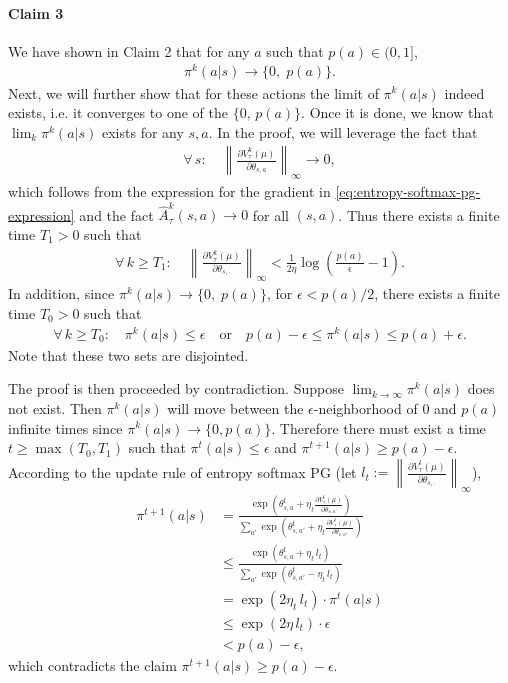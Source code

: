     \paragraph{Claim 3} We have shown in Claim 2 that for any $a$ such that $p(a) \in (0, 1]$,
    \begin{align*}
        \pi^k(a|s) \to \{ 0, \; p(a) \}.
    \end{align*}
    Next, we will further show that for these actions the limit of $\pi^k(a|s)$ indeed exists, i.e. it converges to one of the $\{0, \, p(a) \}$. Once it is done, we know that $\lim_k \pi^k(a|s)$ exists for any $s,a$. In the proof, we will leverage the fact that
    \begin{align*}
        \forall\, s: \quad  \left\|\frac{\partial V^k_\tau(\mu)}{\partial \theta_{s,a}}
        \right\|_\infty\to 0,
    \end{align*}
    which follows from the expression for the gradient in \eqref{eq:entropy-softmax-pg-expression} and the fact $\hat{A}^k_\tau(s,a) \to 0$ for all $(s,a)$. Thus there exists a finite time $T_1 > 0$ such that
    \begin{align*}
        \forall\, k \geq T_1: \quad \left\|\frac{\partial V^k_\tau(\mu)}{\partial \theta_{s,\cdot}} \right\|_\infty < \frac{1}{2\eta} \log \left( \frac{p(a)}{\epsilon} - 1 \right).
    \end{align*}
      In addition, since $\pi^k(a|s) \to \{ 0, \; p(a) \}$, for $\epsilon < p(a) / 2$, there exists a finite time $T_0 > 0$ such that
    \begin{align*}
        \forall\, k \geq T_0: \quad \pi^k(a|s) \leq \epsilon \quad \mathrm{or} \quad p(a) - \epsilon \leq \pi^k(a|s) \leq p(a) + \epsilon.
    \end{align*}
    Note that these two sets are disjointed. 
    
    The proof is then proceeded by contradiction.
    Suppose $\lim_{k\to\infty} \pi^k(a|s)$ does not exist.
    Then $\pi^k(a|s)$ will move between the $\epsilon$-neighborhood of $0$ and $p(a)$ infinite times since $\pi^k(a|s) \to \{0,p(a) \}$. Therefore there must exist a time $t \geq \max(T_0,T_1)$ such that $\pi^t(a|s) \leq \epsilon$ and $\pi^{t+1}(a|s) \geq p(a)-\epsilon$. According to the update rule of entropy softmax PG (let $l_t := \left\| \frac{\partial V^t_\tau(\mu)}{\partial \theta_{s,\cdot}} \right\|_\infty$),
    \begin{align*}
        \pi^{t+1}(a|s)& = \frac{\exp\left( \theta_{s,a}^t + \eta_t \frac{\partial V^t_\tau(\mu)}{\partial \theta_{s,a}} \right)}{\sum_{a'} \exp\left( \theta_{s,a'}^t + \eta_t \frac{\partial V^t_\tau(\mu)}{\partial \theta_{s,a'}} \right)} \\
        &\leq \frac{\exp \left( \theta_{s,a}^t + \eta_t \, l_t \right)}{\sum_{a'} \exp\left( \theta_{s,a'}^t - \eta_t \,l_t \right)} \\
        &= \exp(2\eta_t\, l_t) \cdot \pi^t(a|s) \\
        &\leq \exp(2\eta\, l_t) \cdot \epsilon \\
        &< p(a) - \epsilon,
    \end{align*}
    which contradicts  the claim  $\pi^{t+1}(a|s) \geq p(a) - \epsilon$. 

